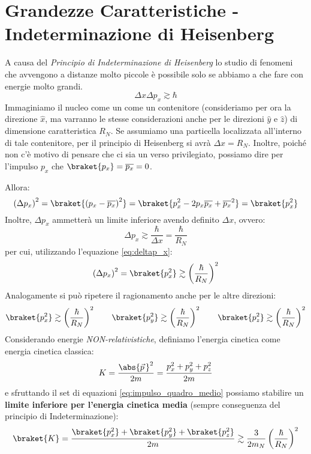 \section{Grandezze Caratteristiche - Indeterminazione di Heisenberg}
A causa del \textit{Principio di Indeterminazione di Heisenberg} lo studio di
fenomeni che avvengono a distanze molto piccole è possibile solo se abbiamo a
che fare con energie molto grandi.
\begin{equation}
  \Delta x \Delta p_x \gtrsim \hbar
\end{equation}
Immaginiamo il nucleo come un come un contenitore (consideriamo per ora la
direzione $\hat{x}$, ma varranno le stesse considerazioni anche per le
direzioni $\hat{y}$ e $\hat{z}$) di dimensione caratteristica $R_N$. Se
assumiamo una particella localizzata all'interno di tale contenitore, per il
principio di Heisenberg si avrà $\Delta x = R_N$. Inoltre, poiché non c'è
motivo di pensare che ci sia un verso privilegiato, possiamo dire per l'impulso
$p_x$ che $\braket{p_x} = \overline{p_x} = 0$.\par
Allora:
\begin{equation}
  \left(\Delta p_x\right)^2 = \braket{\left(p_x - \overline{p_x}\right)^2} =
  \braket{p_x^2 - 2p_x\overline{p_x} + \overline{p_x}^2} = \braket{p_x^2}
  \label{eq:deltap_x}
\end{equation}
Inoltre, $\Delta p_x$ ammetterà un limite inferiore avendo definito $\Delta x$,
ovvero:
\begin{equation}
  \Delta p_x \gtrsim \frac{\hbar}{\Delta x} = \frac{\hbar}{R_N}
\end{equation}
per cui, utilizzando l'equazione \ref{eq:deltap_x}:
\begin{equation}
  \left(\Delta p_x\right)^2 = \braket{p_x^2} \gtrsim
  \left(\frac{\hbar}{R_N}\right)^2
\end{equation}
Analogamente si può ripetere il ragionamento anche per le altre direzioni:
\begin{equation}
  \braket{p_x^2} \gtrsim \left(\frac{\hbar}{R_N}\right)^2
  \qquad
  \braket{p_y^2} \gtrsim \left(\frac{\hbar}{R_N}\right)^2
  \qquad
  \braket{p_z^2} \gtrsim \left(\frac{\hbar}{R_N}\right)^2
  \label{eq:impulso_quadro_medio}
\end{equation}
Considerando energie \textit{NON-relativistiche}, definiamo l'energia cinetica
come energia cinetica classica:
\begin{equation}
  K = \frac{\abs{\vec{p}\,}^2}{2m} = \frac{p_x^2 + p_y^2 + p_z^2}{2m}
\end{equation}
e sfruttando il set di equazioni \ref{eq:impulso_quadro_medio} possiamo
stabilire un \textbf{limite inferiore
per l'energia cinetica media} (sempre conseguenza del principio di
Indeterminazione):
\begin{equation}
  \braket{K} = \frac{\braket{p_x^2} + \braket{p_y^2} + \braket{p_z^2}}{2m}
  \gtrsim \frac{3}{2m_N} \left(\frac{\hbar}{R_N}\right)^2
\end{equation}

